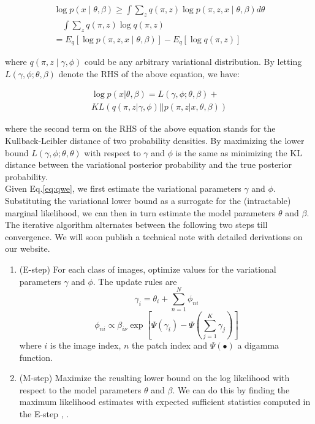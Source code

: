 \documentclass[10pt,a4paper,twocolumn]{article}
\begin{document}
\begin{equation}
\begin{split}
\log p(x\mid \theta, \beta)
\geq \int\sum_{z}q(\pi, z)\log p(\pi, z, x\mid \theta, \beta)d\theta \\
\quad\int\sum_{z}q(\pi, z)\log q(\pi, z) \\
=E_{q}[\log p(\pi, z, x\mid \theta, \beta)]-E_{q}[\log q(\pi, z)]
\end{split}
\end{equation}

where $q(\pi,z\mid\gamma,\phi)$ could be any arbitrary variational distribution. By letting $L(\gamma,\phi;\theta,\beta)$ denote the RHS of the above equation, we have:

\begin{equation} \label{eq:qwe}
\begin{split}
\log p(x\vert \theta, \beta) = L(\gamma, \phi;\theta, \beta)+\\
KL(q(\pi, z\vert \gamma, \phi)\vert\vert p(\pi, z\vert x, \theta, \beta))
\end{split}
\end{equation}

where the second term on the RHS of the above equation stands for the Kullback-Leibler distance of two probability densities. By maximizing the lower bound $L(\gamma,\phi;\theta,\theta)$ with respect to $\gamma$ and $\phi$ is the same as minimizing the KL distance between the variational posterior probability and the true posterior probability.\\ 

Given Eq.\ref{eq:qwe}, we first estimate the variational parameters $\gamma$ and $\phi$. Substituting the variational lower bound as a surrogate for the (intractable) marginal likelihood, we can then in turn estimate the model parameters $\theta$ and $\beta$. The iterative algorithm alternates between the following two steps till convergence. We will soon publish a technical note with detailed derivations on our website.

\begin{enumerate}
\item (E-step) For each class of images, optimize values for the variational parameters $\gamma$ and $\phi$. The update rules are
\begin{equation}
\gamma_{i} = \theta_{i}+\sum_{n=1}^{N}\phi_{ni}
\end{equation}
\begin{equation}
\phi_{ni} \propto \beta_{i\nu}\exp\left[\Psi(\gamma_{i})-\Psi(\sum_{j=1}^{K}\gamma_{j})\right]
\end{equation}
where $i$ is the image index, $n$ the patch index and $\Psi(\bullet)$ a digamma function.
\item (M-step) Maximize the reuslting lower bound on the log likelihood with respect to the model parameters $\theta$ and $\beta$. We can do this by finding the maximum likelihood estimates with expected sufficient statistics computed in the E-step \cite{blei}, \cite{minka}.
\end{enumerate}
\end{document}

